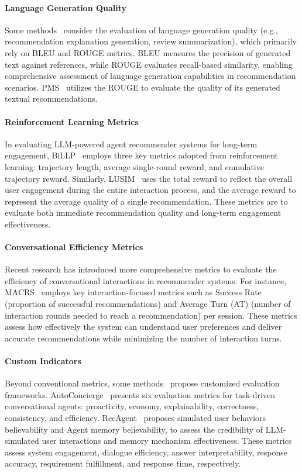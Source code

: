 \paragraph{Language Generation Quality} Some methods~\cite{wang2024recmind} consider the evaluation of language generation quality (e.g., recommendation explanation generation, review summarization), which primarily rely on BLEU and ROUGE metrics.  
BLEU measures the precision of generated text against references, while ROUGE evaluates recall-based similarity, enabling comprehensive assessment of language generation capabilities in recommendation scenarios.
PMS~\cite{pms} utilizes the ROUGE to evaluate the quality of its generated textual recommendations.

\paragraph{Reinforcement Learning Metrics} In evaluating LLM-powered agent recommender systems for long-term engagement, BiLLP~\cite{shi2024large} employs three key metrics adopted from reinforcement learning: trajectory length, average single-round reward, and cumulative trajectory reward. 
Similarly, LUSIM~\cite{lusim} uses the total reward to reflect the overall user engagement during the entire interaction process, and the average reward to represent the average quality of a single recommendation.
These metrics are to evaluate both immediate recommendation quality and long-term engagement effectiveness.

\paragraph{Conversational Efficiency Metrics} Recent research has introduced more comprehensive metrics to evaluate the efficiency of conversational interactions in recommender systems. For instance, MACRS~\cite{fang2024multi} employs key interaction-focused metrics such as Success Rate  (proportion of successful recommendations) and Average Turn (AT) (number of interaction rounds needed to reach a recommendation) per session. 
These metrics assess how effectively the system can understand user preferences and deliver accurate recommendations while minimizing the number of interaction turns.

\paragraph{Custom Indicators} Beyond conventional metrics, some methods~\cite{yoon2024evaluating} propose customized evaluation frameworks.
AutoConcierge~\cite{zeng2024automated} presents six evaluation metrics for task-driven conversational agents: proactivity, economy, explainability, correctness, consistency, and efficiency.
RecAgent~\cite{wang2023user} proposes simulated user behaviors believability and Agent memory believability, to assess the credibility of LLM-simulated user interactions and memory mechanism effectiveness.
These metrics assess system engagement, dialogue efficiency, answer interpretability, response accuracy, requirement fulfillment, and response time, respectively.

